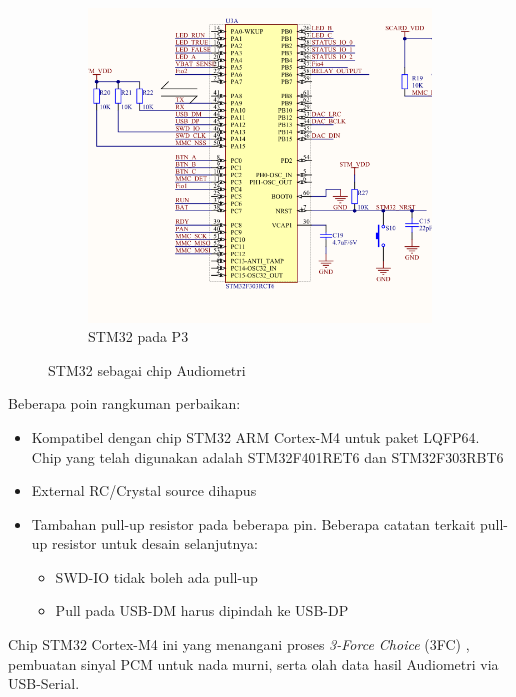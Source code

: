 \documentclass{book} %
\begin{document}
\begin{figure}[!ht]
\begin{subfigure}[t]{0.40\textwidth}
    		\includegraphics[width=\textwidth]{images/p3_stm32}
    		\caption{STM32 pada P3}
    	\end{subfigure}
    	\caption{STM32 sebagai chip Audiometri}
    \end{figure}

	Beberapa poin rangkuman perbaikan:
	\begin{itemize}
		\item Kompatibel dengan chip STM32 ARM Cortex-M4 untuk paket LQFP64.
		Chip yang telah digunakan adalah STM32F401RET6 dan STM32F303RBT6
		
		\item External RC/Crystal source dihapus
		
		\item Tambahan pull-up resistor pada beberapa pin.
		Beberapa catatan terkait pull-up resistor untuk desain selanjutnya:
		\begin{itemize}
			\item SWD-IO tidak boleh ada pull-up
			\item Pull pada USB-DM harus dipindah ke USB-DP
		\end{itemize}
	\end{itemize}

	Chip STM32 Cortex-M4 ini yang menangani proses \textit{3-Force Choice} (3FC) ,
	pembuatan sinyal PCM untuk nada murni, serta olah data hasil Audiometri via USB-Serial.
    
\end{document}
